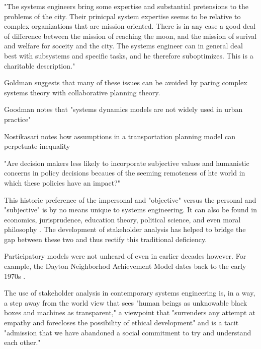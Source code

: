 "The systems engineers bring some expertise and substantial pretensions to the problems of the city. Their prinicpal system expertise seems to be relative to complex organizations that are mission oriented. There is in any case a good deal of difference between the mission of reaching the moon, and the mission of surival and welfare for soceity and the city. The systems engineer can in general deal best with subsystems and specific tasks, and he therefore suboptimizes. This is a charitable description." \cite{robinsonDecisionmakingUrbanPlanning1972}

Goldman suggests that many of these issues can be avoided by paring complex systems theory with collaborative planning theory. \cite{goodspeedScenarioPlanningCities2020}

Goodman notes that "systems dynamics models are not widely used in urban practice" \cite{goodspeedScenarioPlanningCities2020}

Nostikasari notes how assumptions in a transportation planning model can perpetuate inequality \cite{nostikasariRepresentationsEverydayTravel2015}

"Are decision makers less likely to incorporate subjective values and humanistic concerns in policy decisions becaues of the seeming remoteness of hte world in which these policies have an impact?" \cite{vereginComputerInnovationAdoption1994}

This historic preference of the impersonal and "objective" versus the personal and "subjective" is by no means unique to systems engineering. It can also be found in economics, jurisprudence, education theory, political science, and even moral philosophy \cite{banuriModernatizationItsDiscontents1990}. The development of stakeholder analysis has helped to bridge the gap between these two and thus rectify this traditional deficiency. 

Participatory models were not unheard of even in earlier decades however. For example, the Dayton Neighborhod Achievement Model dates back to the early 1970s \cite{lightWarfareWelfareDefense2005}.

The use of stakeholder analysis in contemporary systems engineering is, in a way, a step away from the world view that sees "human beings as unknowable black boxes and machines as transparent," a viewpoint that "surrenders any attempt at empathy and forecloses the possibility of ethical development" and is a tacit "admission that we have abandoned a social commitment to try and understand each other." \cite{eubanksAutomatingInequalityHow2018}

